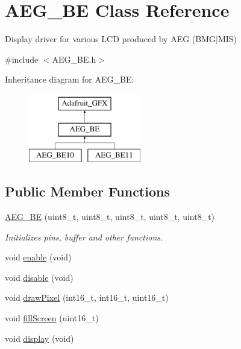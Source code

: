 \hypertarget{class_a_e_g___b_e}{}\section{A\+E\+G\+\_\+\+BE Class Reference}
\label{class_a_e_g___b_e}


Display driver for various L\+CD produced by A\+EG (B\+M\+G$\vert$\+M\+IS)  




{\ttfamily \#include $<$A\+E\+G\+\_\+\+B\+E.\+h$>$}

Inheritance diagram for A\+E\+G\+\_\+\+BE\+:\begin{figure}[H]
\begin{center}
\leavevmode
\includegraphics[height=3.000000cm]{class_a_e_g___b_e}
\end{center}
\end{figure}
\subsection*{Public Member Functions}
\begin{DoxyCompactItemize}
\item 
\hyperlink{class_a_e_g___b_e_a85bd3c991a670cf65ed70bca2af49413}{A\+E\+G\+\_\+\+BE} (uint8\+\_\+t, uint8\+\_\+t, uint8\+\_\+t, uint8\+\_\+t, uint8\+\_\+t)
\begin{DoxyCompactList}\small\item\em Initializes pins, buffer and other functions. \end{DoxyCompactList}\item 
void \hyperlink{class_a_e_g___b_e_aa8755698903c6e198ca1a07788541d1a}{enable} (void)
\item 
void \hyperlink{class_a_e_g___b_e_a340ce74a24ba0dc26c05519a7f865f3c}{disable} (void)
\item 
void \hyperlink{class_a_e_g___b_e_a1256522fd3165e2894b59fee10eab621}{draw\+Pixel} (int16\+\_\+t, int16\+\_\+t, uint16\+\_\+t)
\item 
void \hyperlink{class_a_e_g___b_e_a26979ef08f0e328d092fecb132da511b}{fill\+Screen} (uint16\+\_\+t)
\item 
void \hyperlink{class_a_e_g___b_e_a01f3830d43086806b1e58a4401268d40}{display} (void)
\end{DoxyCompactItemize}


